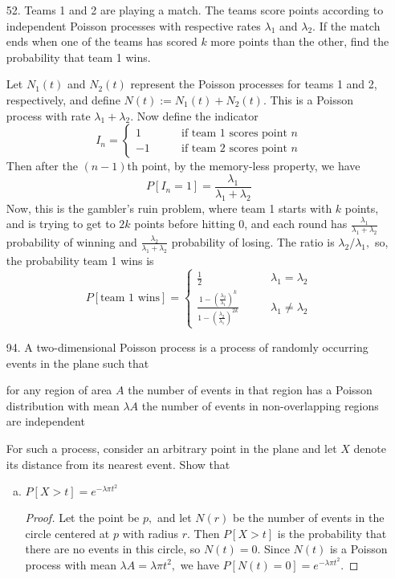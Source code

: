 \documentclass{article}
\begin{document}
\begin{itemize}
	\item[52.] Teams 1 and 2 are playing a match. The teams score points according to independent Poisson processes with respective rates $\lambda_1$ and $\lambda_2.$ If the match ends when one of the teams has scored $k$ more points than the other, find the probability that team 1 wins.
		\begin{soln}
			Let $N_1(t)$ and $N_2(t)$ represent the Poisson processes for teams 1 and 2, respectively, and define $N(t):=N_1(t)+N_2(t).$ This is a Poisson process with rate $\lambda_1+\lambda_2.$ Now define the indicator 
			\[I_n = \begin{cases}
					1 &\quad\quad\text{if team 1 scores point }n \\
					-1 &\quad\quad\text{if team 2 scores point }n
			\end{cases}\]
			Then after the $(n-1)$th point, by the memory-less property, we have
			\[P[I_n=1] = \frac{\lambda_1}{\lambda_1+\lambda_2}\]
			Now, this is the gambler's ruin problem, where team 1 starts with $k$ points, and is trying to get to $2k$ points before hitting 0, and each round has $\frac{\lambda_1}{\lambda_1+\lambda_2}$ probability of winning and $\frac{\lambda_2}{\lambda_1+\lambda_2}$ probability of losing. The ratio is $\lambda_2/\lambda_1,$ so, the probability team 1 wins is
			\[P[\text{team 1 wins}] = 
				\begin{cases}
					\frac{1}{2} &\quad\quad \lambda_1=\lambda_2 \\
					\frac{1-\left( \frac{\lambda_2}{\lambda_1} \right)^k}{1-\left( \frac{\lambda_2}{\lambda_1} \right)^{2k}} &\quad\quad \lambda_1\neq \lambda_2
			\end{cases}\]
		\end{soln}

	\item[94.] A two-dimensional Poisson process is a process of randomly occurring events in the plane such that
		\begin{enumerate}[(i)]
				\ii for any region of area $A$ the number of events in that region has a Poisson distribution with mean $\lambda A$
				\ii the number of events in non-overlapping regions are independent
		\end{enumerate}
		For such a process, consider an arbitrary point in the plane and let $X$ denote its distance from its nearest event. Show that
		\begin{enumerate}[(a)]
			\item $P[X>t]=e^{-\lambda \pi t^2}$
				\begin{proof}
					Let the point be $p,$ and let $N(r)$ be the number of events in the circle centered at $p$ with radius $r.$ Then $P[X>t]$ is the probability that there are no events in this circle, so $N(t)=0.$ Since $N(t)$ is a Poisson process with mean $\lambda A = \lambda \pi t^2,$ we have $P[N(t)=0] = e^{-\lambda \pi t^2}.$
				\end{proof}


\end{enumerate}
\end{itemize}
\end{document}
